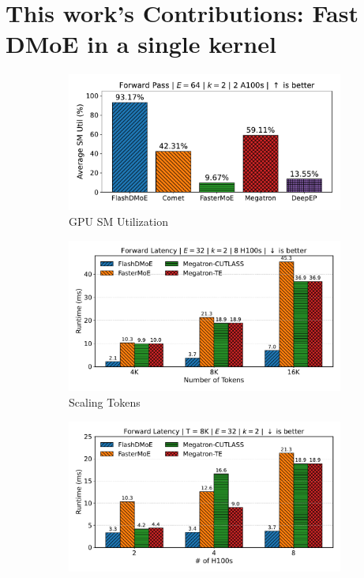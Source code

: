 \section{This work's Contributions: Fast DMoE in a single kernel}\label{sec:contributions:-moe-operator-in-a-single-kernel}
\begin{figure}[!h]
    \centering
    \begin{subfigure}{0.4\textwidth}
        \centering
        \includegraphics[width=\linewidth, keepaspectratio]{figures/sm_util}
        \caption{GPU SM Utilization}
        \label{sub:util}
    \end{subfigure}
    \begin{subfigure}{0.4\textwidth}
        \centering
        \includegraphics[width=\linewidth, keepaspectratio]{figures/scaling_tokens_8}
        \caption{Scaling Tokens}
        \label{sub:tok}
    \end{subfigure}
    \begin{subfigure}{0.4\textwidth}
        \centering
        \includegraphics[width=\linewidth, keepaspectratio]{figures/scaling_gpus_8}

\end{subfigure}
\end{figure}

